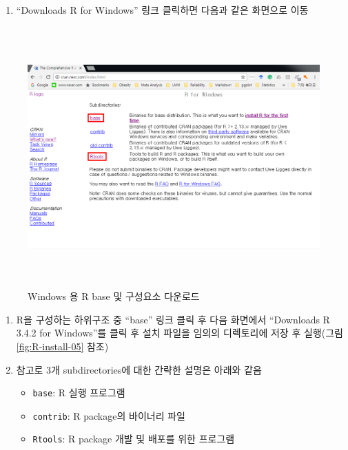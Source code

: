 \documentclass[12pt,a4paper]{book}
\providecommand{\tightlist}{%
  \setlength{\itemsep}{0pt}\setlength{\parskip}{0pt}}
\begin{document}
\begin{enumerate}
\def\labelenumi{\arabic{enumi}.}
\setcounter{enumi}{4}
\tightlist
\item
  ``Downloads R for Windows'' 링크 클릭하면 다음과 같은 화면으로 이동
\end{enumerate}

\begin{figure}[h]
{
  \centering
  \includegraphics[width = 12cm, height = 10cm]{Figures/Rinstall-02.png}
  \caption[Windows 용 R base 및 구성요소 다운로드]{Windows 용 R base 및 구성요소 다운로드}\label{fig:R-install-04}
}
\end{figure}

\begin{enumerate}
\def\labelenumi{\arabic{enumi}.}
\setcounter{enumi}{5}
\item
  R을 구성하는 하위구조 중 ``base'' 링크 클릭 후 다음 화면에서
  ``Downloads R 3.4.2 for Windows''를 클릭 후 설치 파일을 임의의
  디렉토리에 저장 후 실행(그림 \ref{fig:R-install-05} 참조)
\item
  참고로 3개 subdirectories에 대한 간략한 설명은 아래와 같음

  \begin{itemize}
  \tightlist
  \item
    \texttt{base}: R 실행 프로그램
  \item
    \texttt{contrib}: R package의 바이너리 파일
  \item
    \texttt{Rtools}: R package 개발 및 배포를 위한 프로그램
  \end{itemize}
\end{enumerate}
\end{document}
